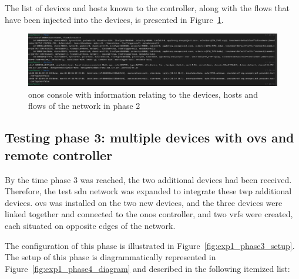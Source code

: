 The list of devices and hosts known to the controller, along with the flows that have been injected into the devices, is presented in Figure~\ref{fig:exp1_phase2_onos}.

\begin{figure}
	\centering
	\includegraphics[width=\textwidth]{Chapters/Figures/tests/ovs_phase_2/onos_topology_&_more.PNG}
	\caption{\gls{onos} console with information relating to the devices, hosts and flows of the network in phase 2}
	\label{fig:exp1_phase2_onos}
\end{figure}

\subsection[Testing phase 3: multiple devices with OvS and remote controller]{Testing phase 3: multiple devices with \gls{ovs} and remote controller}
By the time phase 3 was reached, the two additional devices had been received. Therefore, the test \gls{sdn} network was expanded to integrate these twp additional devices. \gls{ovs} was installed on the two new devices, and the three devices were linked together and connected to the \gls{onos} controller, and two \glspl{vrf} were created, each situated on opposite edges of the network. 

The configuration of this phase is illustrated in Figure~\ref{fig:exp1_phase3_setup}. The setup of this phase is diagrammatically represented in Figure~\ref{fig:exp1_phase4_diagram} and described in the following itemized list:


